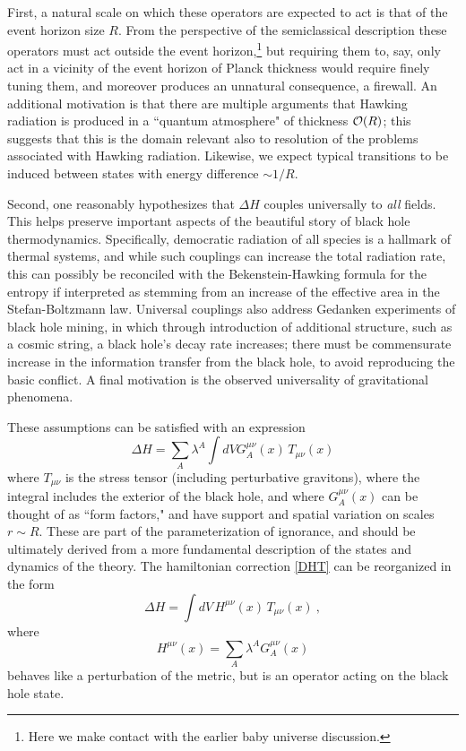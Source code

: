 \documentclass[12pt]{article}
\numberwithin{equation}{section}
\newcommand{\calo}{{\cal O}}
\newcommand{\beq}{\begin{equation}}
\newcommand{\eeq}{\end{equation}}
\begin{document}
First, a natural scale on which these operators are expected to act is that of the event horizon size $R$.  From the perspective of the semiclassical description these operators must act outside the event horizon,\footnote{Here we make contact with the earlier baby universe discussion.} but requiring them to, say, only act in a vicinity of the event horizon of Planck thickness would require finely tuning them, and moreover produces an unnatural consequence, a firewall\cite{SGTrieste,Brau}\cite{AMPS}.   An additional motivation is that there are multiple arguments\cite{SGBoltz,DLP}\cite{SGsch,SG2d,GiPe} that Hawking radiation is produced in a ``quantum atmosphere" of thickness $\calo(R)$; this suggests that this is the domain relevant also to resolution of the problems associated with Hawking radiation.   Likewise, we expect typical transitions to be induced between states with energy difference $\sim 1/R$.

Second, one reasonably hypothesizes that $\Delta H$ couples universally to {\it all} fields.  This helps preserve important aspects of the beautiful story of black hole thermodynamics.  Specifically, democratic radiation of all species is a hallmark of thermal systems, and while such couplings can increase the total radiation rate, this can possibly be reconciled with the Bekenstein-Hawking formula for the entropy if interpreted as stemming from an increase of the effective area in the Stefan-Boltzmann law\cite{SGBoltz}.  Universal couplings also address\cite{NVNL,NVUEFT,NVNLT} Gedanken experiments of black hole mining\cite{UnWamine,LaMa,FrFu,Frol}, in which through introduction of additional structure, such as a cosmic string, a black hole's decay rate increases; there must be commensurate increase in the information transfer from the black hole, to avoid reproducing the basic conflict.  A final motivation is the observed universality of gravitational phenomena.

These assumptions can be satisfied with an expression
\beq\label{DHT}
\Delta H = \sum_A \lambda^A \int dV G_A^{\mu\nu}(x)\,T_{\mu\nu}(x)
\eeq
where $T_{\mu\nu}$ is the stress tensor (including perturbative gravitons), where the integral includes the exterior of the black hole, and where $G^{\mu\nu}_A(x)$ can be thought of as ``form factors," and have support and spatial variation on scales $r\sim R$.  These are part of the parameterization of ignorance, and should be ultimately derived from a more fundamental description of the states and dynamics of the theory.  
The hamiltonian correction \eqref{DHT} can be reorganized in the form
\beq
\Delta H = \int dV\, H^{\mu\nu}(x) \,T_{\mu\nu}(x)\ ,
\eeq
where 
\beq
H^{\mu\nu}(x)=\sum_A\lambda^A G_A^{\mu\nu}(x)
\eeq
behaves like a perturbation of the metric, but is an operator acting on the black hole state.
\end{document}
